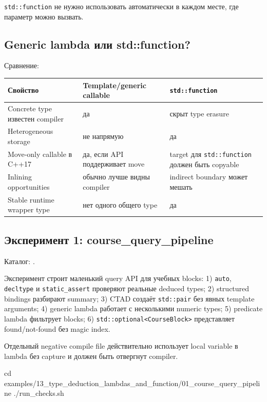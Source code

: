 \texttt{std::function} не нужно использовать автоматически в каждом месте,
где параметр можно вызвать.

\subsection{Generic lambda или std::function?}

Сравнение:

\begin{center}
\begin{tabularx}{\textwidth}{L{0.25\textwidth}YY}
\toprule
Свойство & Template/generic callable & \texttt{std::function} \\
\midrule
Concrete type известен compiler & да & скрыт type erasure \\
Heterogeneous storage & не напрямую & да \\
Move-only callable в C++17 & да, если API поддерживает move & target для \texttt{std::function} должен быть copyable \\
Inlining opportunities & обычно лучше видны compiler & indirect boundary может мешать \\
Stable runtime wrapper type & нет одного общего type & да \\
\bottomrule
\end{tabularx}
\end{center}

\subsection{Эксперимент 1: course\_query\_pipeline}

Каталог:
.

Эксперимент строит маленький query API для учебных blocks:
1) \texttt{auto}, \texttt{decltype} и \texttt{static\_assert} проверяют реальные deduced types; 2) structured bindings разбирают summary; 3) CTAD создаёт \texttt{std::pair} без явных template arguments; 4) generic lambda работает с несколькими numeric types; 5) predicate lambda фильтрует blocks; 6) \texttt{std::optional<CourseBlock>} представляет found/not-found без magic index.

Отдельный negative compile file действительно использует local variable в
lambda без capture и должен быть отвергнут compiler.

\begin{shellcode}
cd examples/13_type_deduction_lambdas_and_function/01_course_query_pipeline
./run_checks.sh
\end{shellcode}

